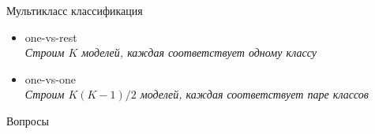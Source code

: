 \documentclass[10pt]{beamer}
\begin{document}
\begin{frame}{Мультикласс классификация}

\begin{itemize}
\item one-vs-rest \\
{\it Строим $K$ моделей, каждая соответствует одному классу}
\item one-vs-one \\
{\it Строим $K(K-1)/2$ моделей, каждая соответствует паре классов}
\end{itemize}

\end{frame}

\begin{frame}

\begin{center}
\Large Вопросы
\end{center}

\end{frame}
\end{document}
